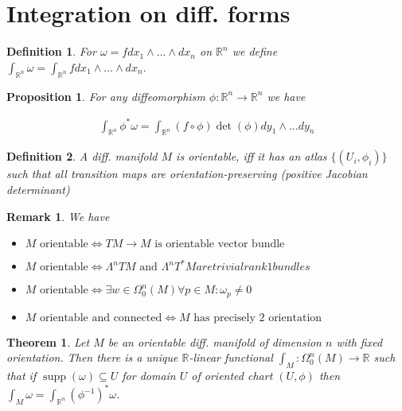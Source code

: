 \documentclass{scrartcl}
\newcommand{\R}{\mathbb R}
\newtheorem*{mydef}{Definition}
\newtheorem*{prop}{Proposition}
\newtheorem*{thm}{Theorem}
\newtheorem*{remark}{Remark}
\begin{document}
\section{Integration on diff. forms}

\begin{mydef}
  For $\omega=f dx_1 \wedge \dots \wedge dx_n$ on $\R^n$ we define $\int_{\R^n} \omega = \int_{\R^n} f dx_1 \wedge \dots \wedge dx_n$.
\end{mydef}

\begin{prop}
  For any diffeomorphism $\phi:\R^n\rightarrow\R^n$ we have 

  \begin{align}
    \int_{\R^n} \phi^*\omega = \int_{\R^n} (f\circ \phi) \operatorname{det}(\phi) dy_1 \wedge \dots dy_n
  \end{align}
\end{prop}

\begin{mydef}
  A diff. manifold $M$ is orientable, iff it has an atlas $\{(U_i,\phi_i)\}$  such that all transition maps are orientation-preserving (positive Jacobian determinant)
\end{mydef}

\begin{remark}
  We have

  \begin{itemize}
  \item $M \text{ orientable} \Leftrightarrow TM\rightarrow M \text{ is orientable vector bundle}$
  \item $M \text{ orientable} \Leftrightarrow \Lambda^n TM \text{ and } \Lambda^n T^*M are trivial rank 1 bundles$
  \item $M \text{ orientable} \Leftrightarrow \exists w\in \Omega^n_0(M) \forall p\in M: \omega_p \ne 0$
  \item $M \text{ orientable and connected} \Leftrightarrow M \text{ has precisely 2 orientation}$
  \end{itemize}
\end{remark}

\begin{thm}
  Let $M$ be an orientable diff. manifold of dimension $n$ with fixed orientation. Then there is a unique $\R$-linear functional $\int_M : \Omega_0^n(M) \rightarrow \R$ such that if $\operatorname{supp}(\omega)\subseteq U$ for domain $U$ of oriented chart $(U, \phi)$ then $\int_M \omega = \int_{\R^n}(\phi^{-1})^* \omega$.  
\end{thm}
\end{document}
